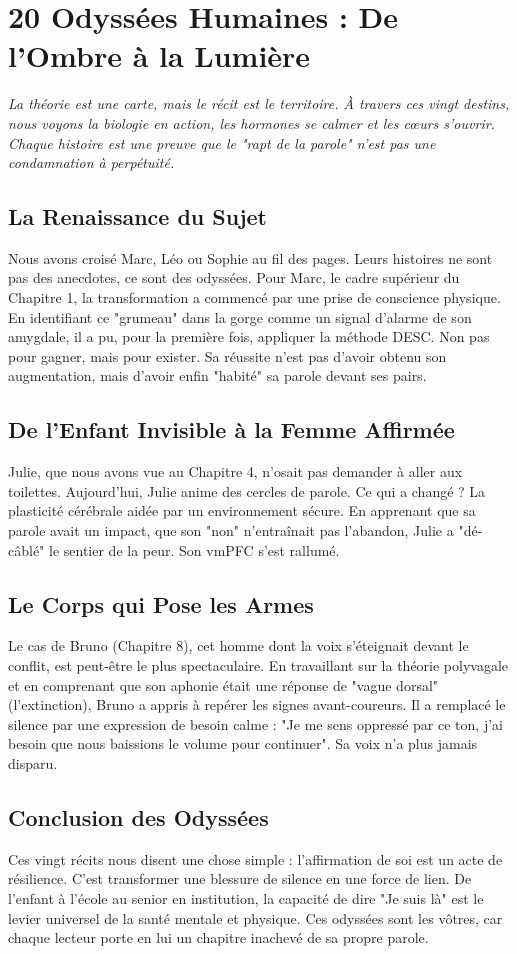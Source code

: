 \chapter{20 Odyssées Humaines : De l'Ombre à la Lumière}

\textit{La théorie est une carte, mais le récit est le territoire. À travers ces vingt destins, nous voyons la biologie en action, les hormones se calmer et les cœurs s'ouvrir. Chaque histoire est une preuve que le "rapt de la parole" n'est pas une condamnation à perpétuité.}

\section{La Renaissance du Sujet}
Nous avons croisé Marc, Léo ou Sophie au fil des pages. Leurs histoires ne sont pas des anecdotes, ce sont des odyssées. Pour Marc, le cadre supérieur du Chapitre 1, la transformation a commencé par une prise de conscience physique. En identifiant ce "grumeau" dans la gorge comme un signal d'alarme de son amygdale, il a pu, pour la première fois, appliquer la méthode DESC. Non pas pour gagner, mais pour exister. Sa réussite n'est pas d'avoir obtenu son augmentation, mais d'avoir enfin "habité" sa parole devant ses pairs.

\section{De l'Enfant Invisible à la Femme Affirmée}
Julie, que nous avons vue au Chapitre 4, n'osait pas demander à aller aux toilettes. Aujourd'hui, Julie anime des cercles de parole. Ce qui a changé ? La plasticité cérébrale aidée par un environnement sécure. En apprenant que sa parole avait un impact, que son "non" n'entraînait pas l'abandon, Julie a "dé-câblé" le sentier de la peur. Son vmPFC s'est rallumé.

\section{Le Corps qui Pose les Armes}
Le cas de Bruno (Chapitre 8), cet homme dont la voix s'éteignait devant le conflit, est peut-être le plus spectaculaire. En travaillant sur la théorie polyvagale et en comprenant que son aphonie était une réponse de "vague dorsal" (l'extinction), Bruno a appris à repérer les signes avant-coureurs. Il a remplacé le silence par une expression de besoin calme : "Je me sens oppressé par ce ton, j'ai besoin que nous baissions le volume pour continuer". Sa voix n'a plus jamais disparu.

\section{Conclusion des Odyssées}
Ces vingt récits nous disent une chose simple : l'affirmation de soi est un acte de résilience. C'est transformer une blessure de silence en une force de lien. De l'enfant à l'école au senior en institution, la capacité de dire "Je suis là" est le levier universel de la santé mentale et physique. Ces odyssées sont les vôtres, car chaque lecteur porte en lui un chapitre inachevé de sa propre parole.
